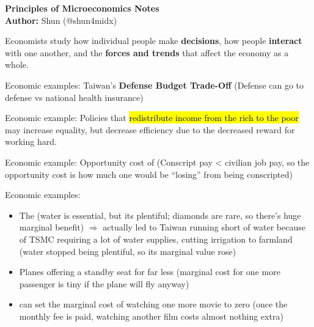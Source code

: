 \documentclass[12pt,a4paper]{article}
\begin{document}
\begin{center}
  {\Large \bf Principles of Microeconomics Notes}\\[8pt]
  \textbf{Author:} Shun (@shun4midx)
\end{center}


\noindent Economists study how individual people make \textbf{decisions}, how people \textbf{interact} with one another, and the \textbf{forces and trends} that affect the economy as a whole. \\




\noindent Economic examples: Taiwan's \textbf{Defense Budget Trade-Off} (Defense can go to defense vs national health insurance) \\


\noindent Economic example: Policies that \hl{redistribute income from the rich to the poor} may increase equality, but decrease efficiency due to the decreased reward for working hard. \\



\noindent Economic example: Opportunity cost of  (Conscript pay < civilian job pay, so the opportunity cost is how much one would be ``losing'' from being conscripted) \\



\noindent Economic examples:
\hn\begin{itemize}
    \item The  (water is essential, but its plentiful; diamonds are rare, so there's huge marginal benefit) $\Rightarrow$ actually led to Taiwan running short of water because of TSMC requiring a lot of water supplies, cutting irrigation to farmland (water stopped being plentiful, so its marginal value rose)
    \item Planes offering a standby seat for far less (marginal cost for one more passenger is tiny if the plane will fly anyway)
    \item {} can set the marginal cost of watching one more movie to zero (once the monthly fee is paid, watching another film costs almost nothing extra)
\end{itemize}
\end{document}
